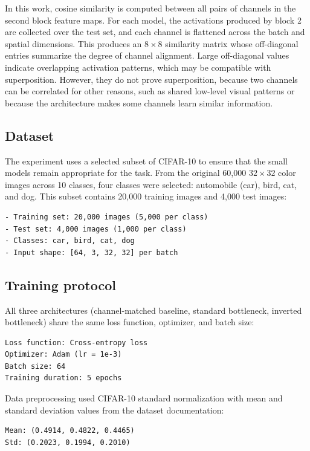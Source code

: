 \documentclass[12pt,a4paper]{report}
\begin{document}
In this work, cosine similarity is computed between all pairs of channels in the second block feature maps. For each model, the activations produced by block 2 are collected over the test set, and each channel is flattened across the batch and spatial dimensions. This produces an \(8 \times 8\) similarity matrix whose off-diagonal entries summarize the degree of channel alignment. Large off-diagonal values indicate overlapping activation patterns, which may be compatible with superposition. However, they do not prove superposition, because two channels can be correlated for other reasons, such as shared low-level visual patterns or because the architecture makes some channels learn similar information.

\subsection{Dataset}
The experiment uses a selected subset of CIFAR-10 to ensure that the small models remain appropriate for the task. From the original 60,000 \(32 \times 32\) color images across 10 classes, four classes were selected: automobile (car), bird, cat, and dog. This subset contains 20,000 training images and 4,000 test images:

\begin{verbatim}
- Training set: 20,000 images (5,000 per class)
- Test set: 4,000 images (1,000 per class)
- Classes: car, bird, cat, dog
- Input shape: [64, 3, 32, 32] per batch
\end{verbatim}

\subsection{Training protocol}
All three architectures (channel-matched baseline, standard bottleneck, inverted bottleneck) share the same loss function, optimizer, and batch size:

\begin{verbatim}
Loss function: Cross-entropy loss
Optimizer: Adam (lr = 1e-3)
Batch size: 64
Training duration: 5 epochs
\end{verbatim}

\noindent Data preprocessing used CIFAR-10 standard normalization with mean and standard deviation values from the dataset documentation:
\begin{verbatim}
Mean: (0.4914, 0.4822, 0.4465)
Std: (0.2023, 0.1994, 0.2010)
\end{verbatim}
\end{document}
